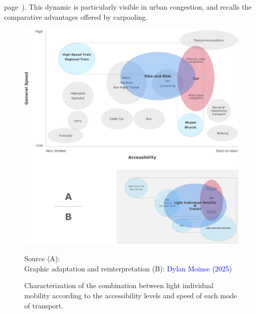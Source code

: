 \begin{refsegment}
page~\pageref{fig-chap1:vitesse-accessibilite-velo-tc}). This dynamic is particularly visible in urban congestion, and recalls the comparative advantages offered by carpooling.%

\begin{figure}[h!]\vspace*{4pt}
    \caption{Characterization of the combination between light individual mobility according to the accessibility levels and speed of each mode of transport.}
    \label{fig-chap1:vitesse-accessibilite-velo-tc}
    \centerline{\includegraphics[width=1\columnwidth]{src/Figures/Chap-1/EN_Kager_vitesse_accessibilite.pdf}}
    \vspace{5pt}
    \begin{flushright}\scriptsize{
    Source (A): \textcolor{blue}{\textcite[212]{kager_characterisation_2016}}
    \\
    Graphic adaptation and reinterpretation (B): \textcolor{blue}{Dylan Moinse (2025)}
    }\end{flushright}
\end{figure}


\end{refsegment}
